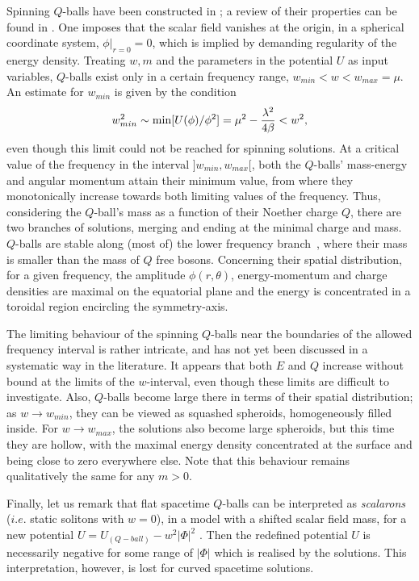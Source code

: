 Spinning $Q$-balls have been constructed  in 
\cite{Volkov:2002aj,Kleihaus:2005me};
a review of their properties can be found in \cite{Radu:2008pp}.
%
One imposes that the scalar field
vanishes at the origin, in a spherical coordinate system,  $\phi|_{r=0}=0$, which is implied by demanding regularity of the energy density.
Treating $w,m$ and the parameters in the potential $U$
as input variables, $Q$-balls 
exist only in a certain frequency range, 
$w_{min} < w < w_{max}=\mu$.
An estimate for $w_{min}$
is given by the condition 
\cite{Volkov:2002aj,Kleihaus:2005me}
\begin{eqnarray}
 w_{min}^2\sim  {\rm min} [U(\phi)/\phi^2]=\mu^2-\frac{\lambda^2}{4\beta}<w^2,
\end{eqnarray}
even though this limit could not be reached for spinning solutions.
%
At a critical value of the frequency in the interval $]w_{min}, w_{max}[$, 
both the $Q$-balls' mass-energy and angular momentum attain their minimum value,
from where they monotonically increase towards both limiting values
of the frequency.
%
Thus, considering the $Q$-ball's mass as a function of their Noether charge $Q$,
there are two branches of solutions, merging and ending
at the minimal charge and mass. 
$Q$-balls are stable along (most of) the lower frequency branch~\cite{Radu:2008pp},
where their mass is smaller than the mass of $Q$ free bosons.
%
Concerning their spatial distribution, for a given frequency, 
the amplitude $\phi(r,\theta)$, energy-momentum and charge
densities are maximal on the equatorial plane and the energy is concentrated in a toroidal
region encircling the symmetry-axis.



The limiting behaviour of the spinning $Q$-balls near the boundaries of the allowed frequency interval
is rather intricate, and has not yet been discussed in a systematic way  in the literature. 
It appears that 
both $E$ and $Q$
increase without bound at the limits of the $w$-interval, even though these limits are difficult to investigate.
Also, $Q$-balls become large there in terms of their spatial distribution;
as $w\to w_{min}$,
they can be viewed as squashed spheroids, homogeneously filled inside.
For $w\to w_{max}$, the solutions
also become large spheroids, but this time they are hollow, with the maximal energy density
concentrated at the surface and being close to zero everywhere else.  
%
Note that this
behaviour remains qualitatively the same for any $m>0$.


Finally, let us remark that flat spacetime $Q$-balls 
can be interpreted as \textit{scalarons} ($i.e.$ static solitons with $w=0$),
in a model with a shifted scalar field mass, for a new potential
$U = U_{(Q-ball) }- w^2|\Phi|^2$  \cite{Kleihaus:2013tba}.
Then the redefined potential $U$ is necessarily negative for some range of $|\Phi|$ which is realised by the solutions.
This interpretation, however, is lost for curved spacetime solutions.

